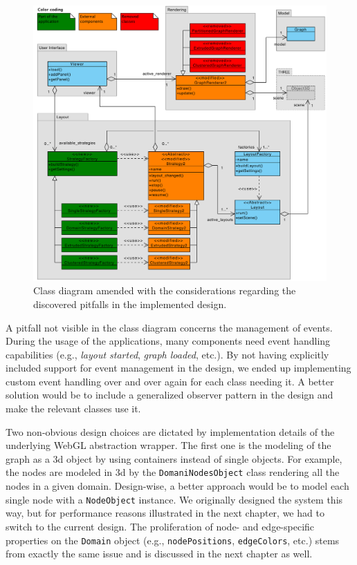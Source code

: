 \begin{figure}
  \begin{adjustwidth}{-2mm}{-0.8mm} 
    \includegraphics[width=\linewidth]{images/diagrams/class-visu-ok}
  \end{adjustwidth}
  \caption[Amended class diagram with changes highlighted.]{Class diagram amended with the considerations regarding the discovered pitfalls in the implemented design.}
  \label{fig:class-visu-ok}
\end{figure}

A pitfall not visible in the class diagram concerns the management of events. During the usage of the applications, many components need event handling capabilities (e.g., \emph{layout started}, \emph{graph loaded}, etc.). By not having explicitly included support for event management in the design, we ended up implementing custom event handling over and over again for each class needing it. A better solution would be to include a generalized observer pattern in the design and make the relevant classes use it.

Two non-obvious design choices are dictated by implementation details of the underlying WebGL abstraction wrapper. The first one is the modeling of the graph as a \gls{3d} object by using containers instead of single objects. For example, the nodes are modeled in \gls{3d} by the \texttt{DomaniNodesObject} class rendering all the nodes in a given domain. Design-wise, a better approach would be to model each single node with a \texttt{NodeObject} instance. We originally designed the system this way, but for performance reasons illustrated in the next chapter, we had to switch to the current design. The proliferation of node- and edge-specific properties on the \texttt{Domain} object (e.g., \texttt{nodePositions}, \texttt{edgeColors}, etc.) stems from exactly the same issue and is discussed in the next chapter as well.



